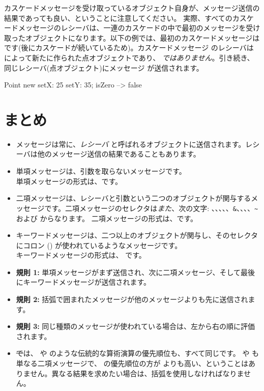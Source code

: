 \documentclass[a4paper,10pt,twoside]{book}
\begin{document}
カスケードメッセージを受け取っているオブジェクト自身が、メッセージ送信の結果であっても良い、ということに注意してください。
実際、すべてのカスケードメッセージのレシーバは、一連のカスケードの中で最初のメッセージを受け取ったオブジェクトになります。以下の例では、最初のカスケードメッセージは  です(後にカスケードが続いているため)。カスケードメッセージ  のレシーバは  によって新たに作られた点オブジェクトであり、 \emph{ではありません}。引き続き、同じレシーバ(点オブジェクト)にメッセージ  が送信されます。

\begin{code}{}
Point new setX: 25 setY: 35; isZero --> false
\end{code}

\section{まとめ}

\begin{itemize}
\item メッセージは常に、\emph{レシーバ} と呼ばれるオブジェクトに送信されます。レシーバは他のメッセージ送信の結果であることもあります。

\item 単項メッセージは、引数を取らないメッセージです。\\
単項メッセージの形式は、です。

\item 二項メッセージは、レシーバと引数という二つのオブジェクトが関与するメッセージです。二項メッセージのセレクタは\emph{また}、次の文字: \ct{+}、\ct{-}、\ct{*}、\ct{/}、\ct{|}、\texttt{\&}、\ct{=}、\ct{>}、\ct{<}、\texttt{\~} および  からなります。
二項メッセージの形式は、です。
\item キーワードメッセージは、二つ以上のオブジェクトが関与し、そのセレクタにコロン (\ct{:}) が使われているようなメッセージです。\\
キーワードメッセージの形式は、
です。

\item \textbf{規則 1:} 単項メッセージがまず送信され、次に二項メッセージ、そして最後にキーワードメッセージが送信されます。
\item \textbf{規則 2:} 括弧で囲まれたメッセージが他のメッセージよりも先に送信されます。
\item \textbf{規則 3:} 同じ種類のメッセージが使われている場合は、左から右の順に評価されます。
\item \st では、\ct{+} や \ct{*} のような伝統的な算術演算の優先順位も、すべて同じです。\ct{+} や \ct{*} も単なる二項メッセージで、\ct{*} の優先順位の方が \ct{+} よりも高い、ということはありません。異なる結果を求めたい場合は、括弧を使用しなければなりません。
\end{itemize}

\ifx\wholebook\relax\else
\end{document}
